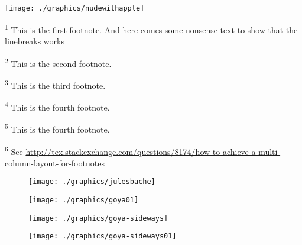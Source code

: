 \begin{sidewaysfigure}
\centering
\texttt{[image: ./graphics/nudewithapple]}
\vspace{3\baselineskip}
\footnoterule\footnotesize
\begin{minipage}[t]{0.49\linewidth}
\textsuperscript{1} This is the first footnote. And here comes some nonsense text
                    to show that the linebreaks works \par
\textsuperscript{2} This is the second footnote.\par
\end{minipage}\hfill
\begin{minipage}[t]{0.49\linewidth}
\textsuperscript{3} This is the third footnote. \par
\textsuperscript{4} This is the fourth footnote.\par
\textsuperscript{5} This is the fourth footnote.\par
\textsuperscript{6} See \url{http://tex.stackexchange.com/questions/8174/how-to-achieve-a-multi-column-layout-for-footnotes}\par
\end{minipage}
\end{sidewaysfigure}


\clearpage

\begin{figure}
\centering
\texttt{[image: ./graphics/julesbache]}
\end{figure}

\begin{figure}
\centering
\texttt{[image: ./graphics/goya01]}
\end{figure}

\begin{figure}
\centering
\texttt{[image: ./graphics/goya-sideways]}
\end{figure}

\begin{figure}
\centering
\texttt{[image: ./graphics/goya-sideways01]}
\end{figure}

\pagebreak

\restoregeometry





